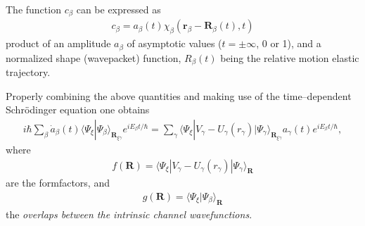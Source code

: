 The function $c_\beta$ can be expressed as
\begin{align}
c_\beta=a_\beta(t)\chi_\beta(\mathbf r_\beta-\mathbf R_\beta(t),t)
\end{align}
product of an amplitude $a_\beta$ of asymptotic values ($t=\pm\infty$, 0 or 1), and a normalized shape (wavepacket) function, $R_\beta(t)$ being the relative motion elastic trajectory.


Properly combining the above quantities and making use of the time--dependent Schr\"odinger equation one obtains 
\begin{align}
i\hbar\sum_{\beta}\dot a_\beta(t)\langle\Psi_\xi|\Psi_\beta\rangle_{\mathbf R_{\xi\gamma}}e^{iE_\beta t/\hbar}=\sum_{\gamma}\langle\Psi_\xi|V_\gamma-U_\gamma(r_\gamma)|\Psi_\gamma\rangle_{\mathbf R_{\xi\gamma}}a_\gamma(t)e^{iE_\beta t/\hbar},
\end{align}
where
\begin{align}
f(\mathbf R)=\langle\Psi_\xi|V_\gamma-U_\gamma(r_\gamma)|\Psi_\gamma\rangle_{\mathbf R}
\end{align}
are the formfactors, and
\begin{align}
g(\mathbf R)=\langle\Psi_\xi|\Psi_\beta\rangle_{\mathbf R}
\end{align}
the \textit{overlaps between the intrinsic channel wavefunctions}.



